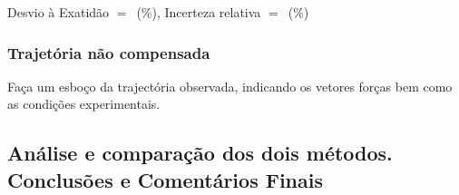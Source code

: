 \documentclass[a4paper,12pt]{article}  %
\begin{document}
\noindent  Desvio à Exatidão $=$~\underline{\makebox[1cm][r]{~}}(\%), 
Incerteza relativa $=$~\underline{\makebox[1cm][r]{~}}($\%$) 

\subsubsection{\sf Trajetória não compensada}
Faça um esboço da trajectória observada, indicando os vetores forças bem como as condições experimentais.
\begin{center}
\framebox[18cm]{\rule{0pt}{6.5cm}}
\end{center}

\subsection{\sf Análise e comparação dos dois métodos. Conclusões e Comentários Finais}
\noindent\underline{\makebox[\textwidth][r]{~}} \\
\noindent\underline{\makebox[\textwidth][r]{~}} \\
\noindent\underline{\makebox[\textwidth][r]{~}} \\
\noindent\underline{\makebox[\textwidth][r]{~}} \\
\noindent\underline{\makebox[\textwidth][r]{~}} \\
\noindent\underline{\makebox[\textwidth][r]{~}} \\
\noindent\underline{\makebox[\textwidth][r]{~}} \\
\noindent\underline{\makebox[\textwidth][r]{~}} \\
\noindent\underline{\makebox[\textwidth][r]{~}} \\
\noindent\underline{\makebox[\textwidth][r]{~}} \\
\noindent\underline{\makebox[\textwidth][r]{~}} \\
\noindent\underline{\makebox[\textwidth][r]{~}} \\
\noindent\underline{\makebox[17cm][r]{~}} \\



\end{document}

